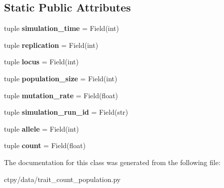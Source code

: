 \subsection*{Static Public Attributes}
\begin{DoxyCompactItemize}
\item 
\hypertarget{classctpy_1_1data_1_1trait__count__population_1_1_trait_count_sample_a929e8abc40bbc300fdf3550b404392d0}{tuple {\bfseries simulation\-\_\-time} = Field(int)}\label{classctpy_1_1data_1_1trait__count__population_1_1_trait_count_sample_a929e8abc40bbc300fdf3550b404392d0}

\item 
\hypertarget{classctpy_1_1data_1_1trait__count__population_1_1_trait_count_sample_a153ac22e85aa8b7881dc6cd9bf695f81}{tuple {\bfseries replication} = Field(int)}\label{classctpy_1_1data_1_1trait__count__population_1_1_trait_count_sample_a153ac22e85aa8b7881dc6cd9bf695f81}

\item 
\hypertarget{classctpy_1_1data_1_1trait__count__population_1_1_trait_count_sample_aa6790e220da226ac39bffdf0f16e72a6}{tuple {\bfseries locus} = Field(int)}\label{classctpy_1_1data_1_1trait__count__population_1_1_trait_count_sample_aa6790e220da226ac39bffdf0f16e72a6}

\item 
\hypertarget{classctpy_1_1data_1_1trait__count__population_1_1_trait_count_sample_a8bef14ceca555d393710f4e6edb9cf7c}{tuple {\bfseries population\-\_\-size} = Field(int)}\label{classctpy_1_1data_1_1trait__count__population_1_1_trait_count_sample_a8bef14ceca555d393710f4e6edb9cf7c}

\item 
\hypertarget{classctpy_1_1data_1_1trait__count__population_1_1_trait_count_sample_ac3bbe96a5b5679c57b62ff4f825c80d3}{tuple {\bfseries mutation\-\_\-rate} = Field(float)}\label{classctpy_1_1data_1_1trait__count__population_1_1_trait_count_sample_ac3bbe96a5b5679c57b62ff4f825c80d3}

\item 
\hypertarget{classctpy_1_1data_1_1trait__count__population_1_1_trait_count_sample_aeb4a48abd2ff007caf8129eed8a7a74a}{tuple {\bfseries simulation\-\_\-run\-\_\-id} = Field(str)}\label{classctpy_1_1data_1_1trait__count__population_1_1_trait_count_sample_aeb4a48abd2ff007caf8129eed8a7a74a}

\item 
\hypertarget{classctpy_1_1data_1_1trait__count__population_1_1_trait_count_sample_a7f4a791925eb3b6db848f59b52a91ba1}{tuple {\bfseries allele} = Field(int)}\label{classctpy_1_1data_1_1trait__count__population_1_1_trait_count_sample_a7f4a791925eb3b6db848f59b52a91ba1}

\item 
\hypertarget{classctpy_1_1data_1_1trait__count__population_1_1_trait_count_sample_aa92a605257c9adb668bcbc48337a4ea0}{tuple {\bfseries count} = Field(float)}\label{classctpy_1_1data_1_1trait__count__population_1_1_trait_count_sample_aa92a605257c9adb668bcbc48337a4ea0}

\end{DoxyCompactItemize}


The documentation for this class was generated from the following file\-:\begin{DoxyCompactItemize}
\item 
ctpy/data/trait\-\_\-count\-\_\-population.\-py\end{DoxyCompactItemize}
